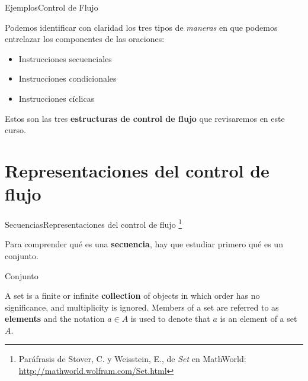 \documentclass[spanish, c]{beamer}
\newcommand\blfootnote[1]{%
\begingroup
\renewcommand\thefootnote{}\footnote{#1}%
\addtocounter{footnote}{-1}%
\endgroup
}
\begin{document}
\begin{frame}{Ejemplos}{Control de Flujo}

    Podemos identificar con claridad los tres tipos de \textit{maneras} en que podemos entrelazar los componentes de las oraciones: \pause

    \bigskip

    \begin{itemize}
        \item Instrucciones \alert{secuenciales}  \pause
        \item Instrucciones \alert{condicionales}  \pause
        \item Instrucciones \alert{cíclicas}  \pause
    \end{itemize}

    \bigskip
    
    Estos son las tres \textbf{estructuras de control de flujo} que revisaremos en este curso.
\end{frame}

\section{Representaciones del control de flujo}

\begin{frame}{Secuencias}{Representaciones del control de flujo}
    \blfootnote{Paráfrasis de Stover, C. y Weisstein, E., de \textit{Set} en MathWorld: \url{http://mathworld.wolfram.com/Set.html}}
    Para comprender qué es una \textbf{secuencia}, hay que estudiar primero qué es un \alert{conjunto}. \pause

    \bigskip

    \begin{block}{Conjunto}
        \begin{displayquote}
            A \alert{set} is a finite or infinite \textbf{collection} of objects in which order has no significance, and multiplicity is ignored.
            Members of a set are referred to as \textbf{elements} and the notation $a \in A$ is used to denote that $a$ is an element of a set $A$.
        \end{displayquote}
    \end{block}
\end{frame}
\end{document}
